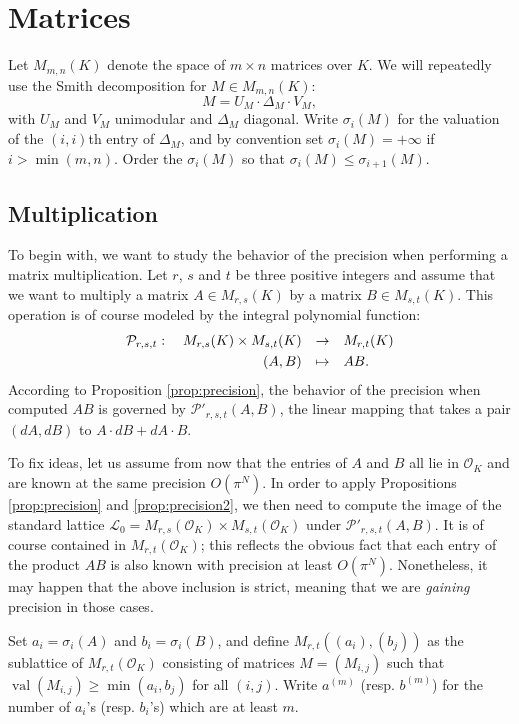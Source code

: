 \documentclass{sig-alternate}
\DeclareMathOperator{\val}{val}
\renewcommand{\O}{\mathcal O}
\begin{document}
\section{Matrices}
\label{sec:matrices}

Let $M_{m,n}(K)$ denote the space of $m \times n$ matrices over $K$.  We will repeatedly
use the Smith decomposition for $M \in M_{m,n}(K)$:
\[
M = U_M \cdot \Delta_M \cdot V_M,
\]
with $U_M$ and $V_M$ unimodular and $\Delta_M$ diagonal.  Write $\sigma_i(M)$
for the valuation of the $(i,i)$th entry of $\Delta_M$, and by convention set
$\sigma_i(M) = +\infty$ if $i > \min(m,n)$.  Order the $\sigma_i(M)$ so that $\sigma_i(M) \le \sigma_{i+1}(M)$.

\subsection{Multiplication}
\label{ssec:mulmatrix}

To begin with, we want to study the behavior of the precision when 
performing a matrix multiplication. Let $r$, $s$ and $t$ be three 
positive integers and assume that we want to multiply a matrix $A \in 
M_{r,s}(K)$ by a matrix $B \in M_{s,t}(K)$. This operation is of course 
modeled by the integral polynomial function:
$$\begin{array}{rcl}
\mathcal P_{r,s,t} : \quad M_{r,s}(K) \times M_{s,t}(K) & \to & 
M_{r,t}(K) \smallskip \\
(A,B) & \mapsto & AB.
\end{array}$$
According to Proposition \ref{prop:precision}, the behavior of the precision when 
computed $AB$ is governed by $\mathcal P'_{r,s,t}(A,B)$, the linear mapping that takes a pair 
$(dA,dB)$ to $A \cdot dB + dA \cdot B$.

To fix ideas, let us assume from now that the entries of $A$ and $B$ all 
lie in $\O_K$ and are known at the same precision $O(\pi^N)$. In order 
to apply Propositions \ref{prop:precision} and \ref{prop:precision2}, we then need to compute the image 
of the standard lattice $\mathcal L_0 = M_{r,s}(\O_K) \times 
M_{s,t}(\O_K)$ under $\mathcal P'_{r,s,t}(A,B)$. It is of course 
contained in $M_{r,t}(\O_K)$; this reflects the obvious fact that each 
entry of the product $AB$ is also known with precision at least $O(\pi^N)$. 
Nonetheless, it may happen that the above inclusion is strict, meaning 
that we are \emph{gaining} precision in those cases.

Set $a_i = \sigma_i(A)$ and $b_i = \sigma_i(B)$, and define $M_{r,t}((a_i),(b_j))$ 
as the sublattice of $M_{r,t}(\O_K)$ consisting of matrices $M = (M_{i,j})$ 
such that $\val(M_{i,j}) \geq \min(a_i,b_j)$ for all $(i,j)$.  Write $a^{(m)}$ (resp. $b^{(m)}$)
for the number of $a_i$'s (resp. $b_i$'s) which are at least $m$.
\end{document}
